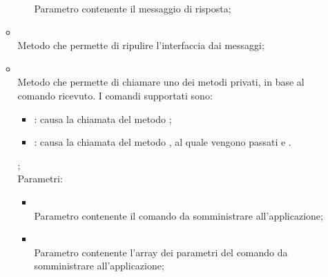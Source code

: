 \begin{itemize}
\begin{itemize}
\begin{itemize}
			Parametro contenente il messaggio di risposta;
		\end{itemize}
		\item[]  \\
		Metodo che permette di ripulire l'interfaccia dai messaggi;\\
		\item[]  \\
		Metodo che permette di chiamare uno dei metodi privati, in base al comando ricevuto.
I comandi supportati sono:
\begin{itemize}
   \item {}: causa la chiamata del metodo ;
   \item {}: causa la chiamata del metodo , al quale vengono passati  e .
\end{itemize}
;\\
		Parametri:
		\begin{itemize}
			\item {} \\
			Parametro contenente il comando da somministrare all'applicazione;
			\item {} \\
			Parametro contenente l'array dei parametri del comando da somministrare all'applicazione;
		\end{itemize}
	\end{itemize}
\end{itemize}
\FloatBarrier

